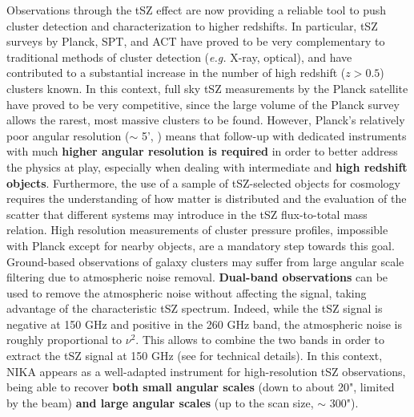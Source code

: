 \documentclass[11pt,a4paper,twoside,graphicx,color]{article}
\begin{document}
Observations through the tSZ effect are now providing a reliable tool to push cluster detection and characterization to higher redshifts. In particular, tSZ surveys by Planck, SPT, and ACT have proved to be very complementary to traditional methods of cluster detection ({\it e.g.} X-ray, optical), and have contributed to a substantial increase in the number of high redshift ($z>0.5$) clusters known. In this context, full sky tSZ measurements by the Planck satellite \cite{planck_sz_cat2013, planck_ymap2013} have proved to be very competitive, since the large volume of the Planck survey allows the rarest, most massive clusters to be found. However, Planck's relatively poor angular resolution ($\sim$ 5', \cite{planck_overview2013}) means that follow-up with dedicated instruments with much {\bf higher angular resolution is required} in order to better address the physics at play, especially when dealing with intermediate and {\bf high redshift objects}. Furthermore, the use of a sample of tSZ-selected objects for cosmology requires the understanding of how matter is distributed and the evaluation of the scatter that different systems may introduce in the tSZ flux-to-total mass relation. High resolution measurements of cluster pressure profiles, impossible with Planck except for nearby objects, are a mandatory step towards this goal. \\

\vspace{-0.3cm}   
Ground-based observations of galaxy clusters may suffer from large angular scale filtering due to atmospheric noise removal. {\bf Dual-band observations} can be used to remove the atmospheric noise without affecting the signal, taking advantage of the characteristic tSZ spectrum. Indeed, while the tSZ signal is negative at 150 GHz and positive in the 260 GHz band, the atmospheric noise is roughly proportional to $\nu^2$. This allows to combine the two bands in order to extract the tSZ signal at 150 GHz (see \cite{adam2013} for technical details). In this context, NIKA appears as a well-adapted instrument for high-resolution tSZ observations, being able to recover {\bf both small angular scales} (down to about 20", limited by the beam) {\bf and large angular scales} (up to the scan size, $\sim$ 300").  
\end{document}
